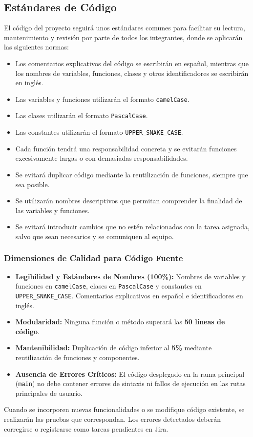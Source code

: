 \subsection{Estándares de Código}

El código del proyecto seguirá unos estándares comunes para facilitar su lectura, mantenimiento y revisión por parte de todos los integrantes, donde se aplicarán las siguientes normas:

\begin{itemize}
    \item Los comentarios explicativos del código se escribirán en español, mientras que los nombres de variables, funciones, clases y otros identificadores se escribirán en inglés.
    \item Las variables y funciones utilizarán el formato \texttt{camelCase}.
    \item Las clases utilizarán el formato \texttt{PascalCase}.
    \item Las constantes utilizarán el formato \texttt{UPPER\_SNAKE\_CASE}.
    \item Cada función tendrá una responsabilidad concreta y se evitarán funciones excesivamente largas o con demasiadas responsabilidades.
    \item Se evitará duplicar código mediante la reutilización de funciones, siempre que sea posible.
    \item Se utilizarán nombres descriptivos que permitan comprender la finalidad de las variables y funciones.
    \item Se evitará introducir cambios que no estén relacionados con la tarea asignada, salvo que sean necesarios y se comuniquen al equipo.
\end{itemize}


\subsubsection{Dimensiones de Calidad para Código Fuente}
\begin{itemize}
    \item \textbf{Legibilidad y Estándares de Nombres (100\%):} Nombres de variables y funciones en \texttt{camelCase}, clases en \texttt{PascalCase} y constantes en \texttt{UPPER\_SNAKE\_CASE}. Comentarios explicativos en español e identificadores en inglés.
    \item \textbf{Modularidad:} Ninguna función o método superará las \textbf{50 líneas de código}.
    \item \textbf{Mantenibilidad:} Duplicación de código inferior al \textbf{5\%} mediante reutilización de funciones y componentes.
    \item \textbf{Ausencia de Errores Críticos:} El código desplegado en la rama principal (\texttt{main}) no debe contener errores de sintaxis ni fallos de ejecución en las rutas principales de usuario.
\end{itemize}
Cuando se incorporen nuevas funcionalidades o se modifique código existente, se realizarán las pruebas que correspondan. Los errores detectados deberán corregirse o registrarse como tareas pendientes en Jira.

